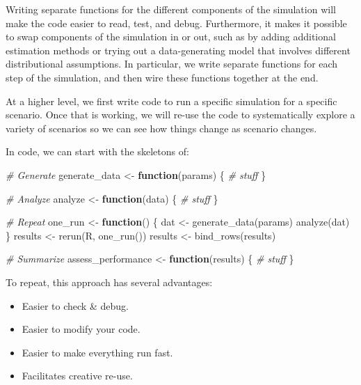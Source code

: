 \documentclass[
]{book}
\newenvironment{Shaded}{\begin{snugshade}}{\end{snugshade}}
\newcommand{\CommentTok}[1]{\textcolor[rgb]{0.56,0.35,0.01}{\textit{#1}}}
\newcommand{\ControlFlowTok}[1]{\textcolor[rgb]{0.13,0.29,0.53}{\textbf{#1}}}
\newcommand{\FunctionTok}[1]{\textcolor[rgb]{0.00,0.00,0.00}{#1}}
\newcommand{\NormalTok}[1]{#1}
\newcommand{\OtherTok}[1]{\textcolor[rgb]{0.56,0.35,0.01}{#1}}
\begin{document}
Writing separate functions for the different components of the simulation will make the code easier to read, test, and debug.
Furthermore, it makes it possible to swap components of the simulation in or out, such as by adding additional estimation methods or trying out a data-generating model that involves different distributional assumptions.
In particular, we write separate functions for each step of the simulation, and then wire these functions together at the end.

At a higher level, we first write code to run a
specific simulation for a specific scenario. Once that is working, we will
re-use the code to systematically explore a variety of scenarios so we can
see how things change as scenario changes.

In code, we can start with the skeletons of:

\begin{Shaded}
\begin{Highlighting}[]
\CommentTok{\# Generate}
\NormalTok{generate\_data }\OtherTok{\textless{}{-}} \ControlFlowTok{function}\NormalTok{(params) \{}
  \CommentTok{\# stuff}
\NormalTok{\}}

\CommentTok{\# Analyze}
\NormalTok{analyze }\OtherTok{\textless{}{-}} \ControlFlowTok{function}\NormalTok{(data) \{}
  \CommentTok{\# stuff}
\NormalTok{\}}

\CommentTok{\# Repeat}
\NormalTok{one\_run }\OtherTok{\textless{}{-}} \ControlFlowTok{function}\NormalTok{() \{}
\NormalTok{  dat }\OtherTok{\textless{}{-}} \FunctionTok{generate\_data}\NormalTok{(params)}
  \FunctionTok{analyze}\NormalTok{(dat)}
\NormalTok{\}}
\NormalTok{results }\OtherTok{\textless{}{-}} \FunctionTok{rerun}\NormalTok{(R, }\FunctionTok{one\_run}\NormalTok{())}
\NormalTok{results }\OtherTok{\textless{}{-}} \FunctionTok{bind\_rows}\NormalTok{(results)}

\CommentTok{\# Summarize}
\NormalTok{assess\_performance }\OtherTok{\textless{}{-}} \ControlFlowTok{function}\NormalTok{(results) \{}
  \CommentTok{\# stuff}
\NormalTok{\}}
\end{Highlighting}
\end{Shaded}

To repeat, this approach has several advantages:

\begin{itemize}
\item
  Easier to check \& debug.
\item
  Easier to modify your code.
\item
  Easier to make everything run fast.
\item
  Facilitates creative re-use.
\end{itemize}
\end{document}
